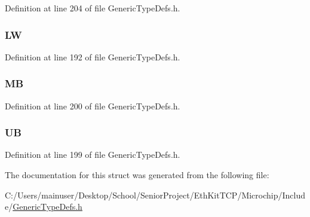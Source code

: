 Definition at line 204 of file Generic\+Type\+Defs.\+h.

\hypertarget{struct_u_i_n_t32___v_a_l_1_1_____p_a_c_k_e_d_a477e8bb9e7a481eaa53cdd13a8c16f9d}{}
\subsubsection[{L\+W}]{ L\+W}\label{struct_u_i_n_t32___v_a_l_1_1_____p_a_c_k_e_d_a477e8bb9e7a481eaa53cdd13a8c16f9d}


Definition at line 192 of file Generic\+Type\+Defs.\+h.

\hypertarget{struct_u_i_n_t32___v_a_l_1_1_____p_a_c_k_e_d_a3fa53b880df06f280ae93ff1a9ce2fe2}{}
\subsubsection[{M\+B}]{ M\+B}\label{struct_u_i_n_t32___v_a_l_1_1_____p_a_c_k_e_d_a3fa53b880df06f280ae93ff1a9ce2fe2}


Definition at line 200 of file Generic\+Type\+Defs.\+h.

\hypertarget{struct_u_i_n_t32___v_a_l_1_1_____p_a_c_k_e_d_acdc7b32fb9574c7c47b314f036cec4ce}{}
\subsubsection[{U\+B}]{ U\+B}\label{struct_u_i_n_t32___v_a_l_1_1_____p_a_c_k_e_d_acdc7b32fb9574c7c47b314f036cec4ce}


Definition at line 199 of file Generic\+Type\+Defs.\+h.



The documentation for this struct was generated from the following file\+:\begin{DoxyCompactItemize}
\item 
C\+:/\+Users/mainuser/\+Desktop/\+School/\+Senior\+Project/\+Eth\+Kit\+T\+C\+P/\+Microchip/\+Include/\hyperlink{_generic_type_defs_8h}{Generic\+Type\+Defs.\+h}\end{DoxyCompactItemize}
